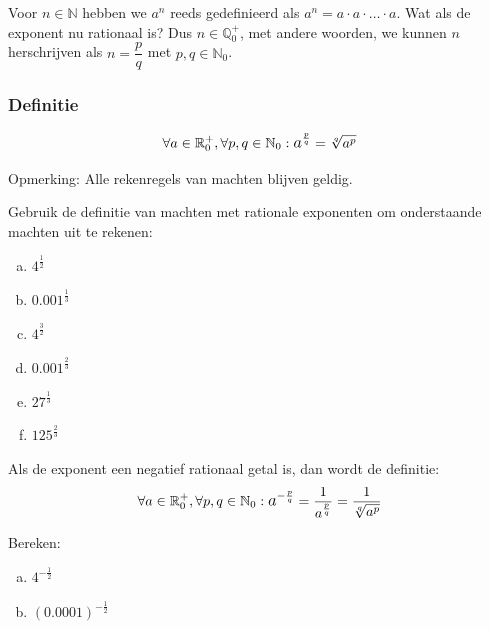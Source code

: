 \documentclass[12pt,twoside,a4paper]{article}
\begin{document}
Voor $n\in\mathbb{N}$ hebben we $a^n$ reeds gedefinieerd als $a^n=a\cdot a\cdot \ldots \cdot a$. Wat als de exponent nu rationaal is? Dus $n\in\mathbb{Q}^+_0$, met andere woorden, we kunnen $n$ herschrijven als $n=\dfrac{p}{q}$ met $p,q\in\mathbb{N}_0$.

\subsubsection*{Definitie}
\begin{mdframed}
$$\forall a \in \mathbb{R}^+_0, \forall p,q\in  \mathbb{N}_0: \mathlarger a^{\frac{p}{q}}=\sqrt[q]{a^p}$$
\end{mdframed}

Opmerking: Alle rekenregels van machten blijven geldig.

\begin{oefening}
Gebruik de definitie van machten met rationale exponenten om onderstaande machten uit te rekenen:
\begin{multicols}{3}
\begin{enumerate}[(a)]
  \itemsep.5em
  \item $4^{\frac{1}{2}}$
  \item $0.001^{\frac{1}{3}}$
  \item $4^{\frac{3}{2}}$
  \item $0.001^{\frac{2}{3}}$
  \item $27^{\frac{1}{3}}$
  \item $125^{\frac{2}{3}}$
\end{enumerate}
\end{multicols}
\end{oefening}

Als de exponent een negatief rationaal getal is, dan wordt de definitie:
$$\forall a \in \mathbb{R}^+_0, \forall p,q\in  \mathbb{N}_0: \mathlarger a^{-\frac{p}{q}}=\dfrac{1}{a^{\frac{p}{q}}}=\dfrac{1}{\sqrt[q]{a^p}}$$

\begin{oefening}
Bereken:
\begin{enumerate}[(a)]
  \itemsep.5em
  \item $4^{-\frac{1}{2}}$
  \item $(0.0001)^{-\frac{1}{2}}$
\end{enumerate}
\end{oefening}
\end{document}
